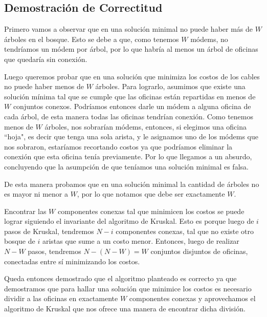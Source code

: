 \vspace{1em}

\subsection{Demostración de Correctitud}
\vspace{1em}

Primero vamos a observar que en una solución minimal no puede haber más de $W$ árboles en el bosque. Esto se debe a que, como tenemos $W$ módems, no tendríamos un módem por árbol, por lo que habría al menos un árbol de oficinas que quedaría sin conexión. 

\vspace{1em}

Luego queremos probar que en una solución que minimiza los costos de los cables no puede haber menos de $W$ árboles. Para lograrlo, asumimos que existe una solución mínima tal que se cumple que las oficinas están repartidas en menos de $W$ conjuntos conexos. Podríamos entonces darle un módem a alguna oficina de cada árbol, de esta manera todas las oficinas tendrían conexión. Como tenemos menos de $W$ árboles, nos sobrarían módems, entonces, si elegimos una oficina ``hoja", es decir que tenga una sola arista, y le asignamos uno de los módems que nos sobraron, estaríamos recortando costos ya que podríamos eliminar la conexión que esta oficina tenía previamente. Por lo que llegamos a un absurdo, concluyendo que la asumpción de que teníamos una solución minimal es falsa.

\vspace{1em}

De esta manera probamos que en una solución minimal la cantidad de árboles no es mayor ni menor a $W$, por lo que notamos que debe ser exactamente $W$. 

\vspace{1em}

Encontrar las $W$ componentes conexas tal que minimicen los costos se puede lograr siguiendo el invariante del algoritmo de Kruskal. Esto es porque luego de $i$ pasos de Kruskal, tendremos $N - i$ componentes conexas, tal que no existe otro bosque de $i$ aristas que sume a un costo menor. Entonces, luego de realizar $N - W$ pasos, tendremos $N - (N - W) = W$ conjuntos disjuntos de oficinas, conectadas entre sí minimizando los costos. 

\vspace{1em}

Queda entonces demostrado que el algoritmo planteado es correcto ya que demostramos que para hallar una solución que minimice los costos es necesario dividir a las oficinas en exactamente $W$ componentes conexas y aprovechamos el algoritmo de Kruskal que nos ofrece una manera de encontrar dicha división.

